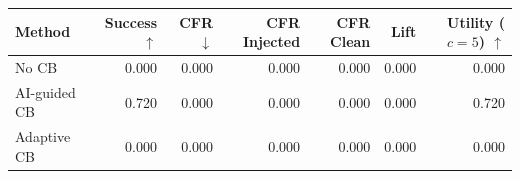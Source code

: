 \begin{tabular}{lrrrrrr}
\toprule
Method & Success $\uparrow$ & CFR $\downarrow$ & CFR Injected & CFR Clean & Lift & Utility ($c=5$) $\uparrow$ \\
\midrule
No CB & 0.000 & 0.000 & 0.000 & 0.000 & 0.000 & 0.000 \\
AI-guided CB & 0.720 & 0.000 & 0.000 & 0.000 & 0.000 & 0.720 \\
Adaptive CB & 0.000 & 0.000 & 0.000 & 0.000 & 0.000 & 0.000 \\
\bottomrule
\end{tabular}
